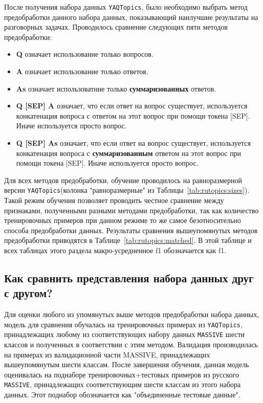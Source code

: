 После получения набора данных \texttt{YAQTopics}, было необходимо выбрать метод предобработки данного набора данных, показывающий наилучшие результаты на разговорных задачах. Проводилось сравнение следующих пяти методов предобработки:

\begin{itemize}
    \item \textbf{Q} означает использование только вопросов.
    \item \textbf{A} означает использование только ответов.
    \item \textbf{As} означает использоватние только \textbf{суммаризованных} ответов.
    \item \textbf{Q [SEP] A} означает, что если ответ на вопрос существует, используется конкатенация вопроса с ответом на этот вопрос при помощи токена [SEP]. Иначе используется просто вопрос. 
    \item \textbf{Q [SEP] As} означает, что если ответ на вопрос существует, используется конкатенация вопроса с \textbf{суммаризованным} ответом на этот вопрос при помощи токена [SEP]. Иначе используется просто вопрос. 
\end{itemize}

Для всех методов предобработки, обучение проводилось на равноразмерной версии \texttt{YAQTopics}(колонка "равноразмерные" из Таблицы~\ref{tab:rutopics:sizes}).
Такой режим обучения позволяет проводить честное сравнение между признаками, полученными разными методами предобработки, так как количество тренировочных примеров при данном режиме то же самое безотносительно способа предобработки данных. Результаты сравнения вышеупомянутых методов предобработки приводятся в Таблице~\ref{tab:rutopics:matched}. В этой таблице и всех таблицах этого раздела макро-усредненное f1 обозначается как f1.
 \subsection{Как сравнить представления набора данных друг с другом?}
Для оценки любого из упомянутых выше методов предобработки набора данных, модель для сравнения обучалась на тренировочных примерах из \texttt{YAQTopics}, принадлежащих любому из соответствующих набору данных \texttt{MASSIVE} шести классов и полученных в соответствии с этим методом. Валидация производилась на примерах из валидационной части MASSIVE, принадлежащих вышеупомянутым шести классам. После завершения обучения, данная модель оценивалась на поднаборе тренировочных+тестовых примеров из русского \texttt{MASSIVE}, принадлежащих соответствующим шести классам из этого набора данных. Этот поднабор обозначается как "объединенные тестовые данные". 

